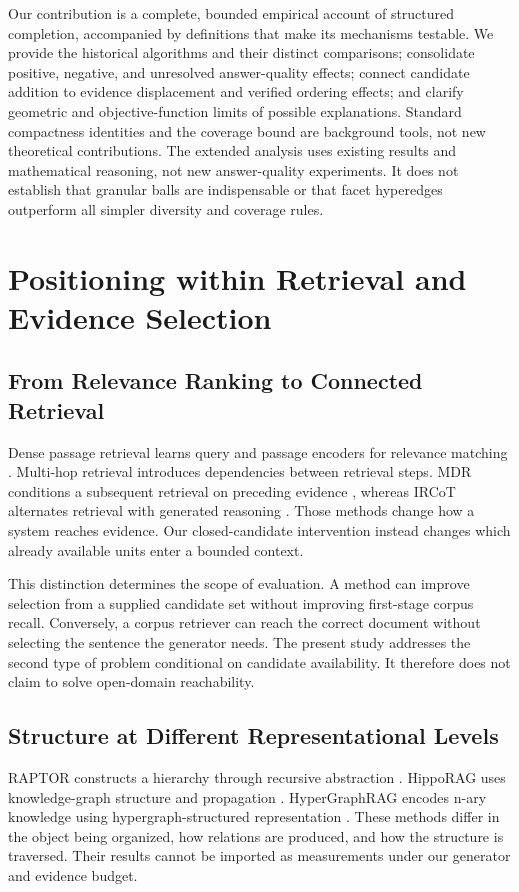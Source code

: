 \documentclass[11pt,a4paper]{article}
\begin{document}
Our contribution is a complete, bounded empirical account of structured
completion, accompanied by definitions that make its mechanisms testable.
We provide the historical algorithms and their distinct comparisons;
consolidate positive, negative, and unresolved answer-quality effects;
connect candidate addition to evidence displacement and verified ordering
effects; and clarify geometric and objective-function limits of possible
explanations. Standard compactness identities and the coverage bound are
background tools, not new theoretical contributions. The extended analysis
uses existing results and mathematical reasoning, not new answer-quality
experiments. It does not establish that granular balls are indispensable or
that facet hyperedges outperform all simpler diversity and coverage rules.

\section{Positioning within Retrieval and Evidence Selection}
\subsection{From Relevance Ranking to Connected Retrieval}
Dense passage retrieval learns query and passage encoders for relevance
matching \citep{karpukhin2020dpr}. Multi-hop retrieval introduces dependencies
between retrieval steps. MDR conditions a subsequent retrieval on preceding
evidence \citep{xiong2021mdr}, whereas IRCoT alternates retrieval with generated
reasoning \citep{trivedi2023ircot}. Those methods change how a system reaches
evidence. Our closed-candidate intervention instead changes which already
available units enter a bounded context.

This distinction determines the scope of evaluation. A method can improve
selection from a supplied candidate set without improving first-stage corpus
recall. Conversely, a corpus retriever can reach the correct document without
selecting the sentence the generator needs. The present study addresses the
second type of problem conditional on candidate availability. It therefore
does not claim to solve open-domain reachability.

\subsection{Structure at Different Representational Levels}
RAPTOR constructs a hierarchy through recursive abstraction
\citep{sarthi2024raptor}. HippoRAG uses knowledge-graph structure and
propagation \citep{gutierrez2024hipporag}. HyperGraphRAG encodes n-ary
knowledge using hypergraph-structured representation
\citep{luo2025hypergraphrag}. These methods differ in the object being
organized, how relations are produced, and how the structure is traversed.
Their results cannot be imported as measurements under our generator and
evidence budget.
\end{document}
